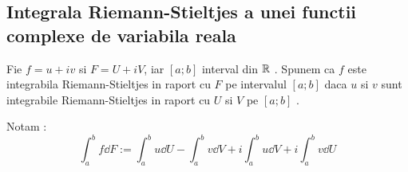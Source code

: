 \subsection{Integrala Riemann-Stieltjes a unei functii complexe de variabila reala}

\begin{definition}
    Fie $f=u+iv$ si $F=U+iV$, iar $[a;b]$ interval din $\mathbb{R}$ . Spunem ca $f$ este integrabila
    Riemann-Stieltjes in raport cu $F$ pe intervalul $[a;b]$ daca $u$ si $v$ sunt integrabile
    Riemann-Stieltjes in raport cu $U$ si $V$ pe $[a;b]$ .

    Notam :
    \begin{equation*}
        \int_a^b f \dd F := \int_a^b u \dd U - \int_a^b v \dd V + i\int_a^b u \dd V + i\int_a^b v \dd U
    \end{equation*}
\end{definition}

